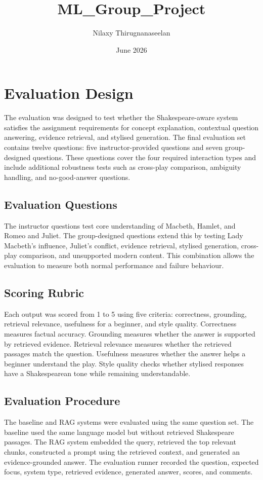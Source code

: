 \documentclass{article}
\title{ML_Group_Project}
\author{Nilaxy Thirugnanaseelan}
\date{June 2026}
\begin{document}
\section{Evaluation Design}

The evaluation was designed to test whether the Shakespeare-aware system satisfies the assignment requirements for concept explanation, contextual question answering, evidence retrieval, and stylised generation. The final evaluation set contains twelve questions: five instructor-provided questions and seven group-designed questions. These questions cover the four required interaction types and include additional robustness tests such as cross-play comparison, ambiguity handling, and no-good-answer questions.

\subsection{Evaluation Questions}

The instructor questions test core understanding of Macbeth, Hamlet, and Romeo and Juliet. The group-designed questions extend this by testing Lady Macbeth's influence, Juliet's conflict, evidence retrieval, stylised generation, cross-play comparison, and unsupported modern content. This combination allows the evaluation to measure both normal performance and failure behaviour.

\subsection{Scoring Rubric}

Each output was scored from 1 to 5 using five criteria: correctness, grounding, retrieval relevance, usefulness for a beginner, and style quality. Correctness measures factual accuracy. Grounding measures whether the answer is supported by retrieved evidence. Retrieval relevance measures whether the retrieved passages match the question. Usefulness measures whether the answer helps a beginner understand the play. Style quality checks whether stylised responses have a Shakespearean tone while remaining understandable.

\subsection{Evaluation Procedure}

The baseline and RAG systems were evaluated using the same question set. The baseline used the same language model but without retrieved Shakespeare passages. The RAG system embedded the query, retrieved the top relevant chunks, constructed a prompt using the retrieved context, and generated an evidence-grounded answer. The evaluation runner recorded the question, expected focus, system type, retrieved evidence, generated answer, scores, and comments.
\end{document}
